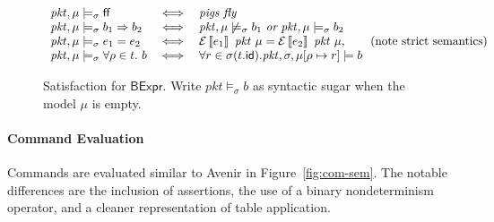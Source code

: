 \documentclass{article}
\newcommand{\pkt}{\mathit{pkt}}
\newcommand{\denote}[1]{\left\llbracket#1\right\rrbracket}
\newcommand{\edenote}[1]{\mathcal{E}\denote{#1}}
\newcommand{\FALSE}{\mathsf{ff}}
\newcommand{\BExpr}{\mathsf{BExpr}}
\newcommand{\id}{\mathsf{id}}
\begin{document}
\begin{figure}
  \[\begin{array}{l>{\iff}cl}
  \pkt,\mu \models_\sigma \FALSE && \textit{pigs fly} \\
  \pkt,\mu \models_\sigma b_1 \Rightarrow b_2 &&
  \pkt,\mu \not\models_\sigma b_1~\textit{or}~
  \pkt,\mu \models_\sigma b_2\\
  \pkt,\mu \models_\sigma e_1 = e_2 &&
  \edenote{e_1}~\pkt~\mu = \edenote{e_2}~\pkt~\mu, \qquad
  \text{(note strict semantics)} \\
  \pkt,\mu \models_\sigma \forall \rho \in t. ~b &&
  \forall r \in \sigma(t.\id).
  \pkt,\sigma,\mu[\rho \mapsto r] \models b
  \end{array}
  \]
  \caption{Satisfaction for $\BExpr$. Write $\pkt \models_\sigma b$ as syntactic
    sugar when the model $\mu$ is empty.}
  \label{fig:bool-satis}
\end{figure}

\paragraph{Command Evaluation}
Commands are evaluated similar to Avenir in Figure~\ref{fig:com-sem}. The
notable differences are the inclusion of assertions, the use of a binary
nondeterminism operator, and a cleaner representation of table application.
\end{document}
